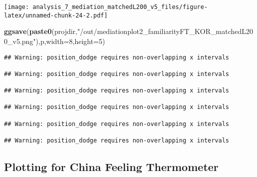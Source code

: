 \documentclass[
]{article}
\newenvironment{Shaded}{\begin{snugshade}}{\end{snugshade}}
\newcommand{\DataTypeTok}[1]{\textcolor[rgb]{0.13,0.29,0.53}{#1}}
\newcommand{\DecValTok}[1]{\textcolor[rgb]{0.00,0.00,0.81}{#1}}
\newcommand{\KeywordTok}[1]{\textcolor[rgb]{0.13,0.29,0.53}{\textbf{#1}}}
\newcommand{\NormalTok}[1]{#1}
\newcommand{\StringTok}[1]{\textcolor[rgb]{0.31,0.60,0.02}{#1}}
\begin{document}
\texttt{[image: analysis\_7\_mediation\_matchedL200\_v5\_files/figure-latex/unnamed-chunk-24-2.pdf]}

\begin{Shaded}
\begin{Highlighting}[]
\KeywordTok{ggsave}\NormalTok{(}\KeywordTok{paste0}\NormalTok{(projdir,}\StringTok{"/out/mediationplot2_familiarityFT_KOR_matchedL200_v5.png"}\NormalTok{),p,}\DataTypeTok{width=}\DecValTok{8}\NormalTok{,}\DataTypeTok{height=}\DecValTok{5}\NormalTok{)}
\end{Highlighting}
\end{Shaded}

\begin{verbatim}
## Warning: position_dodge requires non-overlapping x intervals

## Warning: position_dodge requires non-overlapping x intervals

## Warning: position_dodge requires non-overlapping x intervals

## Warning: position_dodge requires non-overlapping x intervals

## Warning: position_dodge requires non-overlapping x intervals

## Warning: position_dodge requires non-overlapping x intervals
\end{verbatim}

\hypertarget{plotting-for-china-feeling-thermometer}{%
\subsection{Plotting for China Feeling
Thermometer}\label{plotting-for-china-feeling-thermometer}}
\end{document}
